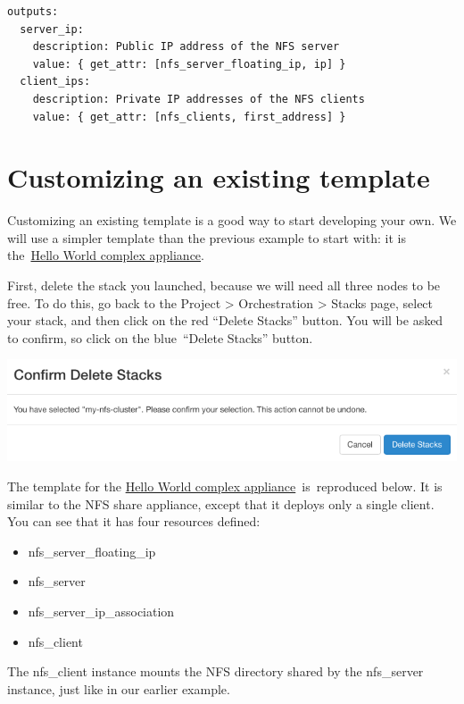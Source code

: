 \begin{footnotesize}
\begin{verbatim}
outputs:
  server_ip:
    description: Public IP address of the NFS server
    value: { get_attr: [nfs_server_floating_ip, ip] }
  client_ips:
    description: Private IP addresses of the NFS clients
    value: { get_attr: [nfs_clients, first_address] }
\end{verbatim}
\end{footnotesize}

\section{Customizing an existing
template}\label{customizing-an-existing-template}

Customizing an existing template is a good way to start developing your
own. We will use a simpler template than the previous example to start
with: it is
the~\href{https://www.chameleoncloud.org/appliances/26/}{Hello World
complex appliance}.

First, delete the stack you launched, because we will need all three
nodes to be free. To do this, go back to the Project \textgreater{}
Orchestration \textgreater{} Stacks page, select your stack, and then
click on the red ``Delete Stacks'' button. You will be asked to confirm,
so click on the blue~``Delete Stacks'' button.

\includegraphics[width=\columnwidth]{images/chameleon/Delete-Stacks.png}

The template for the
\href{https://www.chameleoncloud.org/appliances/26/}{Hello World complex
appliance}~is~reproduced below. It is similar to the NFS share
appliance, except that it deploys only a single client. You can see that
it has four resources defined:

\begin{itemize}
\item
  nfs\_server\_floating\_ip
\item
  nfs\_server
\item
  nfs\_server\_ip\_association
\item
  nfs\_client
\end{itemize}

The nfs\_client instance mounts the NFS directory shared by the
nfs\_server instance, just like in our earlier example.

